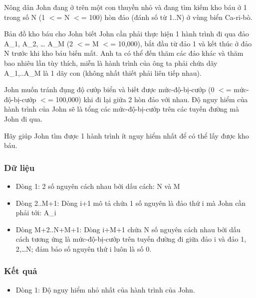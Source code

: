 



   Nông dân John đang ở trên một con thuyền nhỏ và đang tìm kiếm  kho báu ở 1 trong số N (1 $<$= N $<$= 100) hòn đảo (đánh số từ 1..N)  ở vùng biển Ca-ri-bò.  

   Bản đồ kho báu cho John biết John cần phải thực hiện 1 hành  trình đi qua đảo A\_1, A\_2, … A\_M (2 $<$= M $<$= 10,000), bắt đầu từ  đảo 1 và kết thúc ở đảo N trước khi kho báu biến mất. Anh ta có thể  đến thăm các đảo khác và thăm bao nhiêu lần tùy thích, miễn là hành  trình của ông ta phải chứa dãy A\_1,..A\_M là 1 dãy con (không nhất  thiết phải liên tiếp nhau).  

   John muốn tránh đụng độ cướp biển và biết được mức-độ-bị-cướp  (0 $<$= mức-độ-bị-cướp $<$= 100,000) khi đi lại giữa 2 hòn đảo với  nhau. Độ nguy hiểm của hành trình của John sẽ là tổng các mức-độ-bị-cướp  trên các tuyến đường mà John đi qua.  

   Hãy giúp John tìm được 1 hành trình ít nguy hiểm nhất để  có thể lấy được kho báu.  

\subsubsection{   Dữ liệu  }
\begin{itemize}
	\item     Dòng 1: 2 số nguyên cách nhau bởi dấu cách: N và M   
	\item     Dòng 2..M+1: Dòng i+1 mô tả chứa 1 số nguyên là đảo thứ i         mà John cần phải tới: A\_i   
	\item     Dòng M+2..N+M+1: Dòng i+M+1 chứa N số nguyên cách nhau bởi dấu cách         tương ứng là mức-độ-bị-cướp trên tuyến đường đi giữa đảo i và          đảo 1, 2,…N; đảm bảo số nguyên thứ i luôn là số 0.   
\end{itemize}

\subsubsection{   Kết quả  }
\begin{itemize}
	\item     Dòng 1: Độ nguy hiểm nhỏ nhất của hành trình của John.   
\end{itemize}

